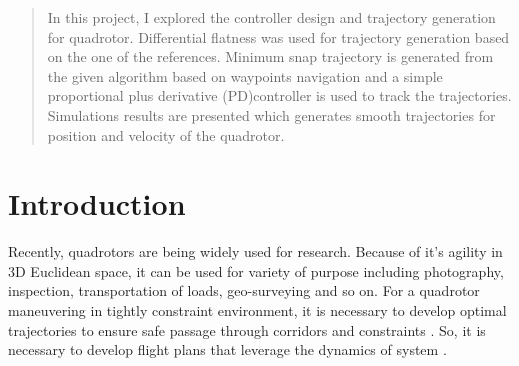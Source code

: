 \documentclass[conference,onecolumn,10pt]{IEEEtran}
\begin{document}




\maketitle

\begin{abstract}

In this project, I explored the controller design and trajectory generation for quadrotor. Differential flatness was used for trajectory generation based on the one of the references. Minimum snap trajectory is generated from the given algorithm based on waypoints navigation and a simple proportional plus derivative (PD)controller is used to track the trajectories. Simulations results are presented which generates smooth trajectories for position and velocity of the quadrotor.



\end{abstract}





%
\IEEEpeerreviewmaketitle



\section{Introduction}
Recently, quadrotors are being widely used for research. Because of it's agility in 3D Euclidean space, it can be used for variety of purpose including photography, inspection, transportation of loads, geo-surveying and so on. For a quadrotor maneuvering in tightly constraint environment, it is necessary to develop optimal trajectories to ensure safe passage through corridors and constraints \cite{mellinger2011minimum}. So, it is necessary to develop flight plans that leverage the dynamics of system \cite{mellinger2011minimum}.
\end{document}
